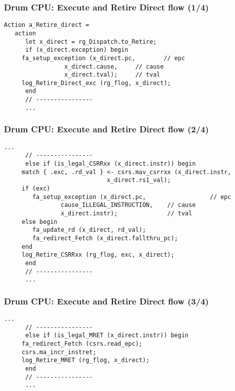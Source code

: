 
\begin{frame}[fragile]
\frametitle{Drum CPU: Execute and Retire Direct flow (1/4)}

\footnotesize

\begin{minipage}{0.725\textwidth}
\begin{Verbatim}[frame=single, label=From src\_Drum/CPU.bsv]
   Action a_Retire_direct =
   action
      let x_direct = rg_Dispatch.to_Retire;
      if (x_direct.exception) begin
	 fa_setup_exception (x_direct.pc,        // epc
			     x_direct.cause,     // cause
			     x_direct.tval);     // tval
	 log_Retire_Direct_exc (rg_flog, x_direct);
      end
      // ----------------
      ...
\end{Verbatim}
\end{minipage}

\end{frame}


\begin{frame}[fragile]
\frametitle{Drum CPU: Execute and Retire Direct flow (2/4)}

\footnotesize

\begin{minipage}{0.725\textwidth}
\begin{Verbatim}[frame=single, label=From src\_Drum/CPU.bsv]
      ...
      // ----------------
      else if (is_legal_CSRRxx (x_direct.instr)) begin
	 match { .exc, .rd_val } <- csrs.mav_csrrxx (x_direct.instr,
						     x_direct.rs1_val);
	 if (exc)
	    fa_setup_exception (x_direct.pc,                  // epc
				cause_ILLEGAL_INSTRUCTION,    // cause
				x_direct.instr);              // tval
	 else begin
	    fa_update_rd (x_direct, rd_val);
	    fa_redirect_Fetch (x_direct.fallthru_pc);
	 end
	 log_Retire_CSRRxx (rg_flog, exc, x_direct);
      end
      // ----------------
      ...
\end{Verbatim}
\end{minipage}

\end{frame}


\begin{frame}[fragile]
\frametitle{Drum CPU: Execute and Retire Direct flow (3/4)}

\footnotesize

\begin{minipage}{0.725\textwidth}
\begin{Verbatim}[frame=single, label=From src\_Drum/CPU.bsv]
      ...
      // ----------------
      else if (is_legal_MRET (x_direct.instr)) begin
	 fa_redirect_Fetch (csrs.read_epc);
	 csrs.ma_incr_instret;
	 log_Retire_MRET (rg_flog, x_direct);
      end
      // ----------------
      ...
\end{Verbatim}
\end{minipage}

\end{frame}

